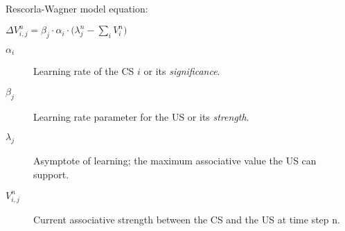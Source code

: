\documentclass[varwidth]{standalone}
\begin{document}
Rescorla-Wagner model equation:

$
\Delta V_{i,j}^n = \beta_j \cdot \alpha_i \cdot \big( \lambda_j^n - \sum_i V_i^{n} \big)
\label{rw_deltaV}
$

\begin{description}
    \item[$\alpha_i$] Learning rate of the CS $i$ or its \emph{significance}.
    \item[$\beta_j$] Learning rate parameter for the US or its \emph{strength}.
    \item[$\lambda_j$] Asymptote of learning; the maximum associative value the US can support.
    \item[$V_{i,j}^n$] Current associative strength between the CS and the US at time step n.
\end{description} \vspace{10pt}
\end{document}
